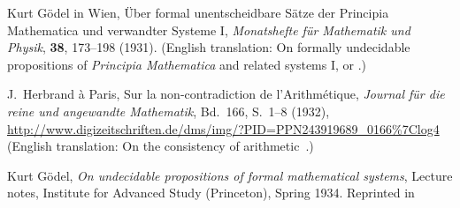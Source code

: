 \documentclass[12pt]{article}
\theoremstyle{remark}
\begin{document}
\begin{thebibliography}{99}
Kurt G\"odel in Wien, \"Uber formal unentscheidbare S\"atze der Principia Mathematica und verwandter Systeme I, \emph{Monatshefte f\"ur Mathematik und Physik}, \textbf{38}, 173--198 (1931). (English translation: On formally undecidable propositions of \emph{Principia Mathematica} and related systems I, \cite[p.~596--616]{vanHeijenoort1967} or \cite[p.~4--38]{Davis1965}.)

J.~Herbrand \`a Paris, Sur la non-contradiction de l'Arithm\'etique, \emph{Journal f\"ur die reine und angewandte Mathematik}, Bd.~166, S.~1--8 (1932), \url{http://www.digizeitschriften.de/dms/img/?PID=PPN243919689_0166%7Clog4} (English translation: On the consistency of arithmetic~\cite[p.~618--628]{vanHeijenoort1967}.)

Kurt G\"odel, \emph{On undecidable propositions of formal mathematical systems}, Lecture notes, Institute for Advanced Study (Princeton), Spring 1934. Reprinted in~\cite[p.~39-74]{Davis1965}


\end{thebibliography}
\end{document}
